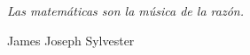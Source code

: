 \cleardoublepage

\thispagestyle{empty} 

\mbox{}\vspace{5cm}

\begin{flushright}
	\begingroup
	\fontsize{10pt}{12pt}\selectfont
	\emph{Las matemáticas son la música de la razón.}
	
	James Joseph Sylvester
	\endgroup
\end{flushright}
